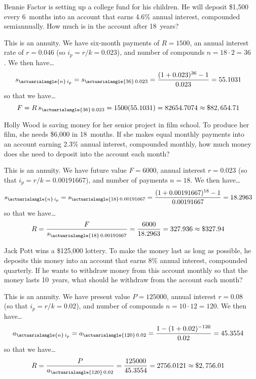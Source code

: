 \documentclass[11pt,letterpaper]{article}
\begin{document}

 Bennie Factor is setting up a college fund for his children. He will deposit \$1,500 every 6~months into an account that earns 4.6\% annual interest, compounded semiannually. How much is in the account after 18~years? \pspace

\sol This is an annuity. We have six-month payments of $R= 1500$, an annual interest rate of $r= 0.046$ (so $i_p= r/k= 0.023$), and number of compounds $n= 18 \cdot 2= 36$. We then have\dots
	\[
	s_{\actuarialangle{n}\,i_p}= s_{\actuarialangle{36}\,0.023}= \dfrac{(1 + 0.023)^{36} - 1}{0.023}= 55.1031
	\]
so that we have\dots
	\[
	F= R\, s_{\actuarialangle{36}\,0.023}= 1500 (55.1031)= 82654.7074 \approx \$82,654.71
	\]



\newpage



 Holly Wood is saving money for her senior project in film school. To produce her film, she needs \$6,000 in 18~months. If she makes equal monthly payments into an account earning 2.3\% annual interest, compounded monthly, how much money does she need to deposit into the account each month? \pspace

\sol This is an annuity. We have future value $F= 6000$, annual interest $r= 0.023$ (so that $i_p= r/k= 0.00191667$), and number of payments $n= 18$. We then have\dots
	\[
	s_{\actuarialangle{n}\,i_p}= s_{\actuarialangle{18}\,0.00191667}= \dfrac{(1 + 0.00191667)^{18} - 1}{0.00191667}= 18.2963
	\]
so that we have\dots
	\[
	R= \dfrac{F}{s_{\actuarialangle{18}\,0.00191667}}= \dfrac{6000}{18.2963}= 327.936 \approx \$327.94
	\]



\newpage



 Jack Pott wins a \$125,000 lottery. To make the money last as long as possible, he deposits this money into an account that earns 8\% annual interest, compounded quarterly. If he wants to withdraw money from this account monthly so that the money lasts 10~years, what should he withdraw from the account each month? \pspace

\sol This is an annuity. We have present value $P= 125000$, annual interest $r= 0.08$ (so that $i_p= r/k= 0.02$), and number of compounds $n= 10 \cdot 12= 120$. We then have\dots
	\[
	a_{\actuarialangle{n}\,i_p}= a_{\actuarialangle{120}\,0.02}= \dfrac{1 - (1 + 0.02)^{-120}}{0.02}= 45.3554
	\]
so that we have\dots
	\[
	R= \dfrac{P}{a_{\actuarialangle{120}\,0.02}}= \dfrac{125000}{45.3554}= 2756.0121 \approx \$2,756.01
	\]
\end{document}
